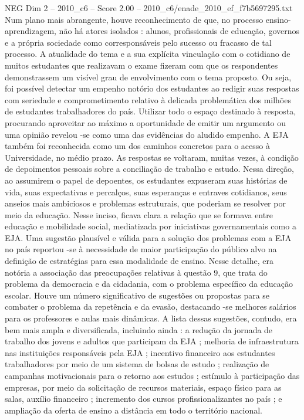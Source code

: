 \begin{textsample}{NEG Dim 2 – 2010\_c6 – Score 2.00 – 2010\_c6/enade\_2010\_ef\_f7b5697295.txt}
Num plano mais abrangente, houve reconhecimento de que, no processo ensino-aprendizagem, não há atores isolados : alunos, profissionais de educação, governos e a própria sociedade como corresponsáveis pelo sucesso ou fracasso de tal processo.
A atualidade do tema e a sua explícita vinculação com o cotidiano de muitos estudantes que realizavam o exame fizeram com que os respondentes demonstrassem um visível grau de envolvimento com o tema proposto.
Ou seja, foi possível detectar um empenho notório dos estudantes ao redigir suas respostas com seriedade e comprometimento relativo à delicada problemática dos milhões de estudantes trabalhadores do país.
Utilizar todo o espaço destinado à resposta, procurando aproveitar ao máximo a oportunidade de emitir um argumento ou uma opinião revelou -se como uma das evidências do aludido empenho.
A EJA também foi reconhecida como um dos caminhos concretos para o acesso à Universidade, no médio prazo.
As respostas se voltaram, muitas vezes, à condição de depoimentos pessoais sobre a conciliação de trabalho e estudo.
Nessa direção, ao assumirem o papel de depoentes, os estudantes expuseram suas histórias de vida, suas expectativas e percalços, suas esperanças e entraves cotidianos, seus anseios mais ambiciosos e problemas estruturais, que poderiam se resolver por meio da educação.
Nesse inciso, ficava clara a relação que se formava entre educação e mobilidade social, mediatizada por iniciativas governamentais como a EJA.
Uma sugestão plausível e válida para a solução dos problemas com a EJA no país reportou -se à necessidade de maior participação do público alvo na definição de estratégias para essa modalidade de ensino.
Nesse detalhe, era notória a associação das preocupações relativas à questão 9, que trata do problema da democracia e da cidadania, com o problema específico da educação escolar.
Houve um número significativo de sugestões ou propostas para se combater o problema da repetência e da evasão, destacando -se melhores salários para os professores e aulas mais dinâmicas.
A lista dessas sugestões, contudo, era bem mais ampla e diversificada, incluindo ainda : a redução da jornada de trabalho dos jovens e adultos que participam da EJA ; melhoria de infraestrutura nas instituições responsáveis pela EJA ; incentivo financeiro aos estudantes trabalhadores por meio de um sistema de bolsas de estudo ; realização de campanhas motivacionais para o retorno aos estudos ; estímulo à participação das empresas, por meio da solicitação de recursos materiais, espaço físico para as salas, auxílio financeiro ; incremento dos cursos profissionalizantes no país ; e ampliação da oferta de ensino a distância em todo o território nacional.

\end{textsample}
